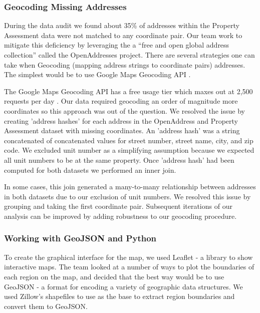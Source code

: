 \documentclass[12pt]{article}
\begin{document}
\subsubsection{Geocoding Missing Addresses}

During the data audit we found about 35\% of addresses within the
Property Assessment data were not matched to any coordinate pair. Our
team work to mitigate this deficiency by leveraging the
a ``free and open global address collection'' called the
OpenAddresses \cite{OpenAddr24:online} project. There are several
strategies one can take when Geocoding (mapping address strings to
coordinate pairs) addresses. The simplest would be to use Google Maps
Geocoding API \cite{GettingS89:online}.

The Google Maps Geocoding API has a free usage tier which maxes out at
2,500 requests per day \cite{GettingS89:online}. Our data required
geocoding an order of magnitude more coordinates so this approach was
out of the question. We resolved the issue by creating 'address hashes'
for each address in the OpenAddress and Property Assessment dataset
with missing coordinates. An 'address hash' was a string concatenated
of concatenated values for street number, street name, city, and zip
code. We excluded unit number as a simplifying assumption because we
expected all unit numbers to be at the same property. Once 'address
hash' had been computed for both datasets we performed an inner join.

In some cases, this join generated a many-to-many relationship between
addresses in both datasets due to our exclusion of unit numbers. We
resolved this issue by grouping and taking the first coordinate pair.
Subsequent iterations of our analysis can be improved by adding
robustness to our geocoding procedure.

\subsubsection{Working with GeoJSON and Python}

To create the graphical interface for the map, we used Leaflet
\cite{Leafleta41:online,Leafletf18:online} - a library to show
interactive maps. The team looked at a number of ways to plot the
boundaries of each region on the map, and decided that the best way would
be to use GeoJSON \cite{RFC7946T67:online} - a format for encoding a
variety of geographic data structures. We used Zillow's shapefiles
\cite{ZillowNe81:online} to use as the base to extract region boundaries
and convert them to GeoJSON. 
\end{document}
